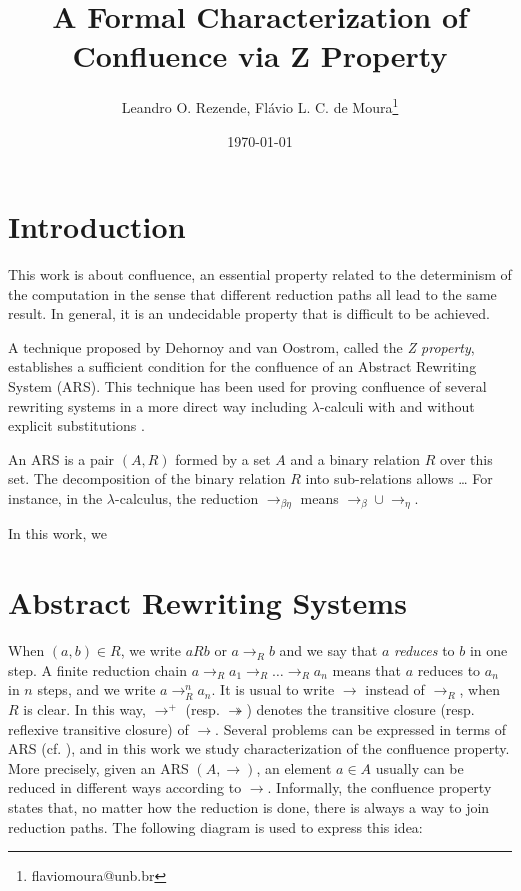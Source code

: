 \documentclass[11pt]{article}
\author{Leandro O. Rezende, Flávio L. C. de Moura\thanks{flaviomoura@unb.br}}
\date{\today}
\title{A Formal Characterization of Confluence via Z Property}
\newcommand{\tto}{\twoheadrightarrow}
\begin{document}
\maketitle

\section{Introduction}
\label{sec:orgf0f9137}

This work is about confluence, an essential property related to the
determinism of the computation in the sense that different reduction
paths all lead to the same result. In general, it is an undecidable
property that is difficult to be achieved.

A technique proposed by Dehornoy and van Oostrom, called the \emph{Z
property}, establishes a sufficient condition for the confluence of an
Abstract Rewriting System (ARS). This technique has been used for
proving confluence of several rewriting systems in a more direct way
including \(\lambda\)-calculi with and without explicit substitutions
\cite{kes09,2016arXiv160903139N}.

An ARS is a pair \((A,R)\) formed by a set \(A\) and a binary relation
\(R\) over this set. The decomposition of the binary relation \(R\) into sub-relations allows \ldots{} For instance, in the \(\lambda\)-calculus, the reduction \(\to_{\beta\eta}\) means \(\to_{\beta} \cup \to_{\eta}\).

In this work, we

\section{Abstract Rewriting Systems}
\label{sec:org9f76804}

 When \((a,b) \in R\),
we write \(a R b\) or \(a \to_R b\) and we say that \(a\) \emph{reduces} to
\(b\) in one step. A finite reduction chain \(a \to_R a_1 \to_R \ldots
\to_R a_n\) means that \(a\) reduces to \(a_n\) in \(n\) steps, and we
write \(a \to_R^n a_n\). It is usual to write \(\to\) instead of
\(\to_R\), when \(R\) is clear. In this way, \(\to^+\)
(resp. \(\tto\)) denotes the transitive closure (resp. reflexive
transitive closure) of \(\to\). Several problems can be expressed in
terms of ARS (cf. \cite{BN98,DershowitzJ90,terese03}), and in this work
we study characterization of the confluence property. More precisely,
given an ARS \((A,\to)\), an element \(a\in A\) usually can be reduced
in different ways according to \(\to\). Informally, the confluence
property states that, no matter how the reduction is done, there is
always a way to join reduction paths. The following diagram is used to
express this idea:
\end{document}
